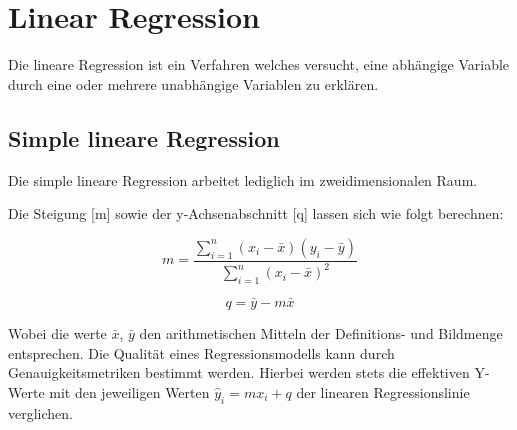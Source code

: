 \newpage
\section{Linear Regression}
\begin{flushleft}

Die lineare Regression ist ein Verfahren welches versucht, eine abhängige Variable durch eine oder mehrere unabhängige Variablen zu erklären.

\subsection{Simple lineare Regression}

Die simple lineare Regression arbeitet lediglich im zweidimensionalen Raum.


Die Steigung [m] sowie der y-Achsenabschnitt [q] lassen sich wie folgt berechnen:

$$m = \dfrac{\sum_{i=1}^n (x_{i} - \bar{x})(y_{i} - \bar{y})}
                       {\sum_{i=1}^n (x_{i} - \bar{x})^{2}}$$

$$q = \bar{y} - m\bar{x}$$

Wobei die werte $\bar{x}$, $\bar{y}$ den arithmetischen Mitteln der Definitions- und Bildmenge entsprechen.
\linebreak
Die Qualität eines Regressionsmodells kann durch Genauigkeitsmetriken bestimmt werden. Hierbei werden stets die effektiven Y-Werte mit den jeweiligen Werten $\hat{y}_{i} = mx_{i} + q$ der linearen Regressionslinie verglichen.



\end{flushleft}
